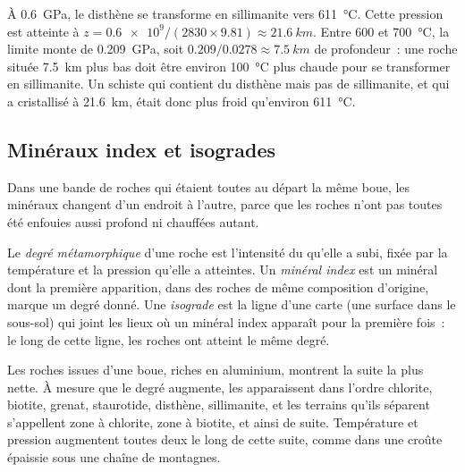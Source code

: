 \begin{example}\label{ex:g12:metamorphic-rocks:kysil}
À \qty{0.6}{GPa}, le disthène se transforme en sillimanite vers
\qty{611}{\celsius}. Cette pression est atteinte à $z = \num{0.6e9} / (2830
\times 9.81) \approx \qty{21.6}{km}$. Entre 600 et \qty{700}{\celsius}, la
limite monte de \qty{0.209}{GPa}, soit $0.209/0.0278 \approx
\qty{7.5}{km}$ de profondeur~: une roche située \qty{7.5}{km} plus bas doit
être environ \qty{100}{\celsius} plus chaude pour se transformer en
sillimanite. Un schiste qui contient du disthène mais pas de sillimanite,
et qui a cristallisé à \qty{21.6}{km}, était donc plus froid qu'environ
\qty{611}{\celsius}.
\end{example}

\subsection{Minéraux index et isogrades}

Dans une bande de roches qui étaient toutes au départ la même boue, les
minéraux changent d'un endroit à l'autre, parce que les roches n'ont pas
toutes été enfouies aussi profond ni chauffées autant.

\begin{definition}\label{def:g12:metamorphic-rocks:index-mineral}
Le \emph{degré métamorphique}
d'une roche est l'intensité du  qu'elle a subi, fixée par la
température et la pression qu'elle a atteintes. Un \emph{minéral
index} est un minéral dont la première
apparition, dans des roches de même composition d'origine, marque un degré
donné. Une \emph{isograde} est la ligne d'une carte (une
surface dans le sous-sol) qui joint les lieux où un minéral index apparaît
pour la première fois~: le long de cette ligne, les roches ont atteint le
même degré.
\end{definition}

Les roches issues d'une boue, riches en aluminium, montrent la suite la plus
nette. À mesure que le degré augmente, les  apparaissent dans
l'ordre chlorite, biotite, grenat, staurotide, disthène, sillimanite, et
les terrains qu'ils séparent s'appellent zone à chlorite, zone à biotite,
et ainsi de suite. Température et pression augmentent toutes deux le long de
cette suite, comme dans une croûte épaissie sous une chaîne de montagnes.


